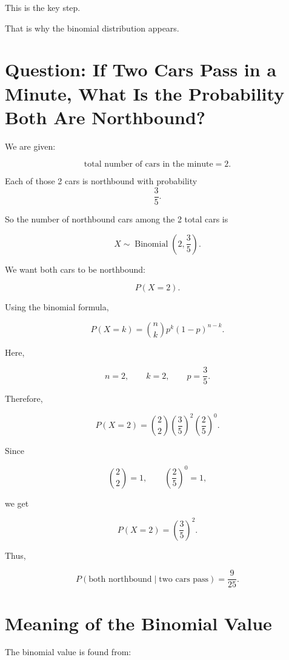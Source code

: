 \documentclass[12pt]{article}
\begin{document}
This is the key step.

\begin{center}
\end{center}

That is why the binomial distribution appears.

\section{Question: If Two Cars Pass in a Minute, What Is the Probability Both Are Northbound?}

We are given:

\[
\text{total number of cars in the minute}=2.
\]

Each of those 2 cars is northbound with probability
\[
\frac{3}{5}.
\]

So the number of northbound cars among the 2 total cars is

\[
X\sim \operatorname{Binomial}\left(2,\frac{3}{5}\right).
\]

We want both cars to be northbound:

\[
P(X=2).
\]

Using the binomial formula,

\[
P(X=k)=\binom{n}{k}p^k(1-p)^{n-k}.
\]

Here,

\[
n=2,\qquad k=2,\qquad p=\frac{3}{5}.
\]

Therefore,

\[
P(X=2)=\binom{2}{2}
\left(\frac{3}{5}\right)^2
\left(\frac{2}{5}\right)^0.
\]

Since

\[
\binom{2}{2}=1,
\qquad
\left(\frac{2}{5}\right)^0=1,
\]

we get

\[
P(X=2)=\left(\frac{3}{5}\right)^2.
\]

Thus,

\[
\boxed{P(\text{both northbound}\mid \text{two cars pass})=\frac{9}{25}.}
\]

\section{Meaning of the Binomial Value}

The binomial value is found from:
\end{document}
